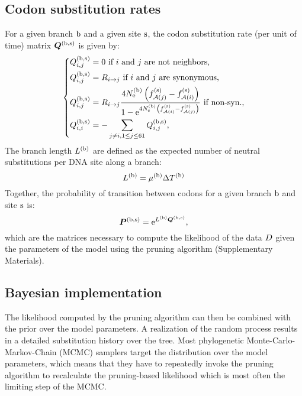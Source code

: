 \subsection{Codon \gls{substitution} rates}
For a given branch $\text{b}$ and a given site $\text{s}$, the \gls{codon} \gls{substitution} rate (per unit of time) matrix $\bm{Q}^{(\text{b}, \text{s})}$ is given by:
\begin{equation}
\label{eq:subrates}
\begin{dcases}
\submatrix\branchsiteexp_{\itoj} = 0\text{ if $\ci$ and $\cj$ are not neighbors,} \\
\submatrix\branchsiteexp_{\itoj} = \mutmatrix_{\nucitoj}\text{ if $\ci$ and $\cj$ are synonymous,} \\
\submatrix\branchsiteexp_{\itoj} = \mutmatrix_{\nucitoj} \dfrac{4\Ne\branchexp \left({\fitj\siteexp - \fiti\siteexp}\right)}{{1 - \e^{4\Ne\branchexp\left({\fiti\siteexp - \fitj\siteexp}\right)} }} \text{ if non-syn.,}\\
\submatrix\branchsiteexp_{\ci, \ci} = - \sum_{ \cj \neq \ci, \jSetCodon} \submatrix\branchsiteexp_{\itoj},
\end{dcases}
\end{equation}
The branch length $L^{(\text{b})}$ are defined as the expected number of \gls{neutral} \glspl{substitution} per \acrshort{DNA} site along a branch:
\begin{equation}
\label{eq:branchlength}
\branchlength\branchexp = \mu\branchexp \branchtime\branchexp
\end{equation}
Together, the probability of {transition} between \glspl{codon} for a given branch $\text{b}$ and site $\text{s}$ is:
\begin{equation}
\label{eq:Probmatrix}
\Probmatrix\branchsiteexp = \e^{\branchlength\branchexp \Submatrix\branchsiteexp},
\end{equation}
which are the matrices necessary to compute the \gls{likelihood} of the data $D$ given the parameters of the model using the pruning algorithm (Supplementary Materials).

\subsection{Bayesian implementation}
\label{sec:Bayesian}
The \gls{likelihood} computed by the pruning algorithm can then be combined with the \gls{prior} over the model parameters.
A realization of the random process results in a detailed \gls{substitution} history over the tree.
Most phylogenetic Monte-Carlo-Markov-Chain (\acrshort{MCMC}) samplers target the distribution over the model parameters, which means that they have to repeatedly invoke the pruning algorithm to recalculate
the pruning-based \gls{likelihood} which is most often the limiting step of the \acrshort{MCMC}.

